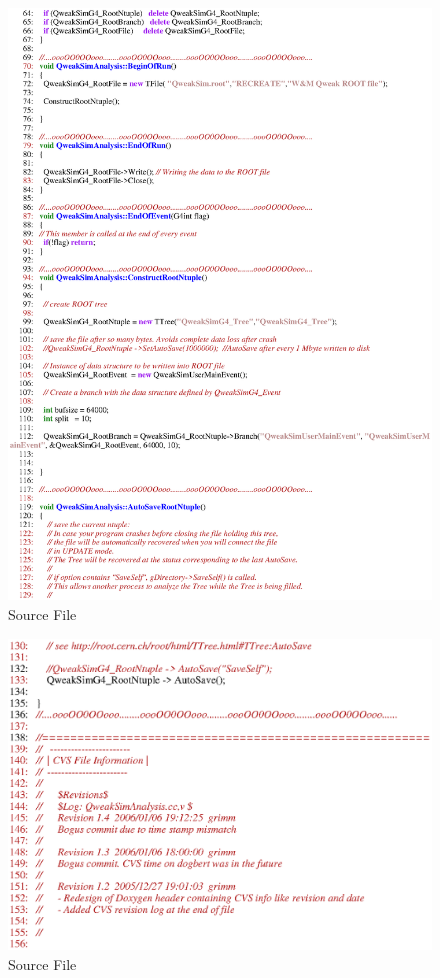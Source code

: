 \begin{figure}[h]
  \hspace{0cm}
  \includegraphics[scale=0.8]{./figures13/QweakSimAnalysis.cc-p2.eps}
  \caption{Source File}
           \label{fig:XIII-SC-4}
\end{figure}

\clearpage

\begin{figure}[h]
  \hspace{0cm}
  \includegraphics[scale=0.8]{./figures13/QweakSimAnalysis.cc-p3.eps}
  \caption{Source File}
           \label{fig:XIII-SC-5}
\end{figure}

